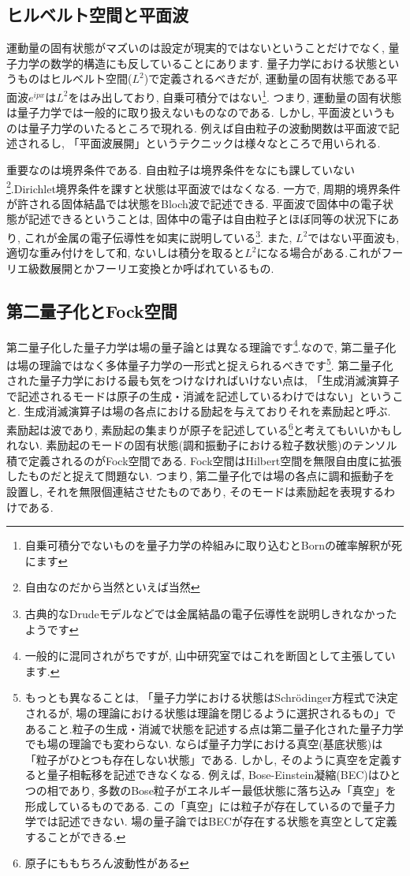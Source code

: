 \documentclass[10.5pt,a4paper]{jreport}
\begin{document}
\subsection{ヒルベルト空間と平面波}
運動量の固有状態がマズいのは設定が現実的ではないということだけでなく, 量子力学の数学的構造にも反していることにあります. 量子力学における状態というものはヒルベルト空間($L^2$)で定義されるべきだが, 運動量の固有状態である平面波$e^{ipx}$は$L^2$をはみ出しており, 自乗可積分ではない\footnote{自乗可積分でないものを量子力学の枠組みに取り込むとBornの確率解釈が死にます}. つまり, 運動量の固有状態は量子力学では一般的に取り扱えないものなのである. しかし, 平面波というものは量子力学のいたるところで現れる. 例えば自由粒子の波動関数は平面波で記述されるし, 「平面波展開」というテクニックは様々なところで用いられる.

重要なのは境界条件である. 自由粒子は境界条件をなにも課していない\footnote{自由なのだから当然といえば当然}.Dirichlet境界条件を課すと状態は平面波ではなくなる. 一方で, 周期的境界条件が許される固体結晶では状態をBloch波で記述できる. 平面波で固体中の電子状態が記述できるということは, 固体中の電子は自由粒子とほぼ同等の状況下にあり, これが金属の電子伝導性を如実に説明している\footnote{古典的なDrudeモデルなどでは金属結晶の電子伝導性を説明しきれなかったようです}. また, $L^2$ではない平面波も, 適切な重み付けをして和, ないしは積分を取ると$L^2$になる場合がある.これがフーリエ級数展開とかフーリエ変換とか呼ばれているもの.

\subsection{第二量子化とFock空間}
第二量子化した量子力学は場の量子論とは異なる理論です\footnote{一般的に混同されがちですが, 山中研究室ではこれを断固として主張しています.}.なので, 第二量子化は場の理論ではなく多体量子力学の一形式と捉えられるべきです\footnote{もっとも異なることは, 「量子力学における状態はSchr\"odinger方程式で決定されるが, 場の理論における状態は理論を閉じるように選択されるもの」であること.粒子の生成・消滅で状態を記述する点は第二量子化された量子力学でも場の理論でも変わらない. ならば量子力学における真空(基底状態)は「粒子がひとつも存在しない状態」である. しかし, そのように真空を定義すると量子相転移を記述できなくなる. 例えば, Bose-Einstein凝縮(BEC)はひとつの相であり, 多数のBose粒子がエネルギー最低状態に落ち込み「真空」を形成しているものである. この「真空」には粒子が存在しているので量子力学では記述できない. 場の量子論ではBECが存在する状態を真空として定義することができる.}. 第二量子化された量子力学における最も気をつけなければいけない点は, 「生成消滅演算子で記述されるモードは原子の生成・消滅を記述しているわけではない」ということ. 生成消滅演算子は場の各点における励起を与えておりそれを素励起と呼ぶ. 素励起は波であり, 素励起の集まりが原子を記述している\footnote{原子にももちろん波動性がある}と考えてもいいかもしれない. 素励起のモードの固有状態(調和振動子における粒子数状態)のテンソル積で定義されるのがFock空間である. Fock空間はHilbert空間を無限自由度に拡張したものだと捉えて問題ない. つまり, 第二量子化では場の各点に調和振動子を設置し, それを無限個連結させたものであり, そのモードは素励起を表現するわけである.
\end{document}
